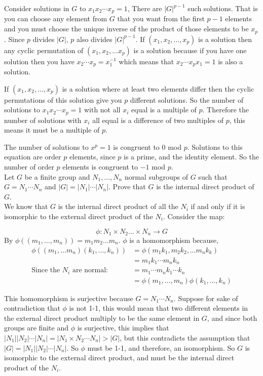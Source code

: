 \documentclass[12pt]{report}
\begin{document}
Consider solutions in $G$ to $x_1x_2\cdots x_p = 1$, There are $|G|^{p-1}$ such
solutions. That is you can choose any element from $G$ that you want from the
first $p-1$ elements and you must choose the unique inverse of the product of
those elements to be $x_p$. Since $p$ divides $|G|$, $p$ also divides
$|G|^{p-1}$. If $(x_1,x_2,\dots,x_p)$ is a solution then any cyclic permutation
of $(x_1,x_2,\dots x_p)$ is a solution because if you have one solution then you
have $x_2\cdots x_p = x_1^{-1}$ which means that $x_2\cdots x_px_1 = 1$ is also
a solution.

If $(x_1,x_2,\dots,x_p)$ is a solution where at least two elements differ then
the cyclic permutations of this solution give you $p$ different solutions. So
the number of solutions to $x_1x_2\cdots x_p = 1$ with not all $x_i$ equal is a
multiple of $p$. Therefore the number of solutions with $x_i$ all equal is a
difference of two multiples of $p$, this means it must be a multiple of $p$.

The number of solutions to $x^p = 1$ is congruent to $0$ mod $p$.  Solutions to
this equation are order $p$ elements, since $p$ is a prime, and the identity
element. So the number of order $p$ elements is congruent to $-1$ mod $p$.\\

Let $G$ be a finite group and $N_1,..., N_n$ normal subgroups of $G$ such that
$G=N_1 \cdots N_n$ and $|G| = |N_1| \cdots |N_n|$. Prove that $G$ is the
internal direct product of $G$.\\

We know that $G$ is the internal direct product of all the $N_i$ if and only if
it is isomorphic to the external direct product of the $N_i$. Consider the
map:

$$\phi: N_1 \times N_2 \dots \times N_n \to G$$
By $\phi((m_1,\dots,m_n)) = m_1m_2\dots m_n$. $\phi$ is a homomorphism because,
\begin{align*}
\phi((m_1,\dots m_n)(k_1,\dots,k_n)) &=\phi(m_1k_1,m_2k_2,\dots m_nk_k)\\
                                     &=m_1k_1\cdots m_nk_n\\
\textrm{Since the $N_i$ are normal:} &=m_1\cdots m_nk_1\cdots k_n\\
                                     &=\phi(m_1,\dots,m_n)\phi(k_1,\dots,k_n)
\end{align*}

This homomorphism is surjective because $G = N_1 \cdots N_n$. Suppose for sake
of contradiction that $\phi$ is not 1-1, this would mean that two different
elements in the external direct product multiply to be the same element in $G$,
and since both groups are finite and $\phi$ is surjective, this implies that
$|N_1||N_2| \cdots |N_n| = |N_1 \times N_2 \cdots N_n| > |G|$, but this
contradicts the assumption that $|G| = |N_1||N_2|\cdots |N_n|$. So $\phi$ must
be 1-1, and therefore, an isomorphism. So $G$ is isomorphic to the external
direct product, and must be the internal direct product of the $N_i$.\\
\end{document}
